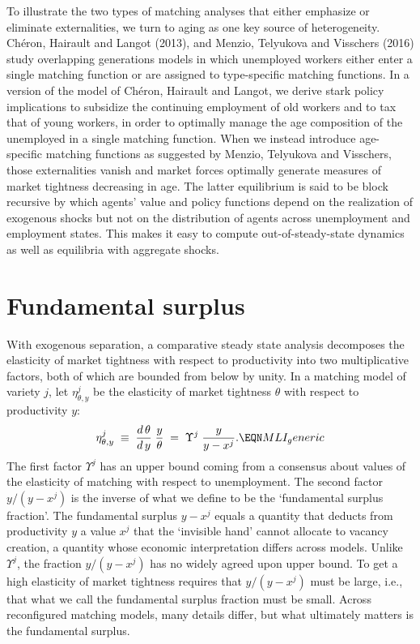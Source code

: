   
  

To illustrate the two types of matching analyses that either
emphasize or eliminate externalities, we turn to aging as one
key source of heterogeneity. Ch\'eron,
Hairault and Langot (2013), and Menzio, Telyukova and Visschers (2016)
study overlapping generations models in which unemployed
workers either enter a single matching function or are assigned
to type-specific matching functions. In a version of the
model of Ch\'eron, Hairault and Langot, we derive
stark policy implications to subsidize the continuing employment
of old workers and to tax that of young workers, in order
to optimally manage the age composition of the unemployed
in a single matching function. When we instead introduce
age-specific matching functions as suggested by
Menzio, Telyukova and Visschers,
those externalities vanish and market forces optimally
generate measures of market tightness decreasing in age.
The latter equilibrium is said to be block recursive by
which agents' value and policy functions depend on the
realization of exogenous shocks but not on the distribution
of agents across unemployment and employment states. This
makes it easy to compute out-of-steady-state dynamics
as well as equilibria with aggregate shocks.


\section{Fundamental surplus}
With exogenous separation,  a comparative steady state analysis decomposes  the elasticity of market tightness with respect to productivity into
two multiplicative factors,  both of which are bounded from below by unity.
In a matching model  of variety $j$, let $\eta^j_{\theta,y}$ be the elasticity of
market tightness $\theta$ with respect to productivity $y$:
$$
 \eta^j_{\theta,y}
\;\equiv\; {d\, \theta \over d\, y} \; {y \over \theta}
\;=\; \Upsilon^j \; \frac{y}{y-x^j} .    \EQN MLI_generic
$$
The first factor $\Upsilon^j$  has  an   upper bound
coming  from a consensus  about values of the elasticity
of matching with respect to unemployment. The second factor
$y/(y-x^j)$ is the inverse of what we  define to be   the
`fundamental surplus fraction'. The fundamental surplus $y-x^j$ equals a quantity that  deducts from productivity $y$ a
value $x^j$ that the `invisible hand' cannot allocate to
vacancy creation, a quantity whose economic interpretation differs across models.  Unlike $\Upsilon^j$, the fraction $y/(y-x^j)$ has no
widely agreed upon upper bound.
To get a high elasticity of market
tightness requires that $y/(y-x^j)$ must  be large, i.e., that  what we call the
fundamental surplus fraction must be small.
 Across reconfigured matching models, many details
differ, but
what ultimately matters is the fundamental surplus.


